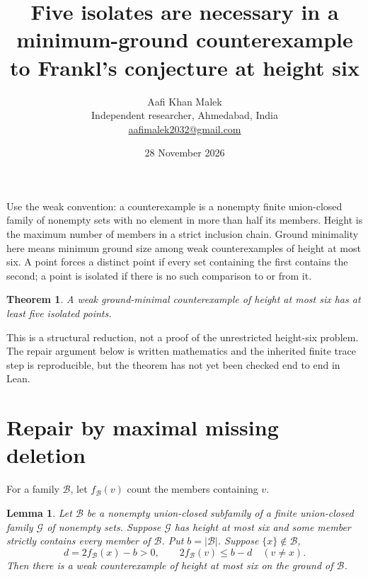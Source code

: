 \documentclass[11pt,letterpaper]{article}
\title{Five isolates are necessary in a minimum-ground counterexample to Frankl's conjecture at height six}
\author{Aafi Khan Malek\\ \small Independent researcher, Ahmedabad, India\\
\small\href{mailto:aafimalek2032@gmail.com}{aafimalek2032@gmail.com}}
\date{28 November 2026}
\newtheorem{lemma}{Lemma}
\newtheorem{theorem}{Theorem}
\begin{document}
\maketitle
Use the weak convention: a counterexample is a nonempty finite
union-closed family of nonempty sets with no element in more than
half its members. Height is the maximum number of members in a
strict inclusion chain. Ground minimality here means minimum ground
size among weak counterexamples of height at most six. A point
forces a distinct point if every set containing the first contains
the second; a point is isolated if there is no such comparison
to or from it.

\begin{theorem}
A weak ground-minimal counterexample of height at most six has at
least five isolated points.
\end{theorem}
This is a structural reduction, not a proof of the unrestricted
height-six problem. The repair argument below is written mathematics
and the inherited finite trace step is reproducible, but the theorem
has not yet been checked end to end in Lean.

\section{Repair by maximal missing deletion}
For a family \(\mathcal B\), let \(f_{\mathcal B}(v)\) count the
members containing \(v\).
\begin{lemma}
Let \(\mathcal B\) be a nonempty union-closed subfamily of a
finite union-closed family \(\mathcal G\) of nonempty sets. Suppose
\(\mathcal G\) has height at most six and some member strictly
contains every member of \(\mathcal B\). Put \(b=|\mathcal B|\).
Suppose \(\{x\}\notin\mathcal B\),
\[
 d=2f_{\mathcal B}(x)-b>0,\qquad
 2f_{\mathcal B}(v)\le b-d\quad(v\ne x).
\]
Then there is a weak counterexample of height at most six on the
ground of \(\mathcal B\).
\end{lemma}
\end{document}
